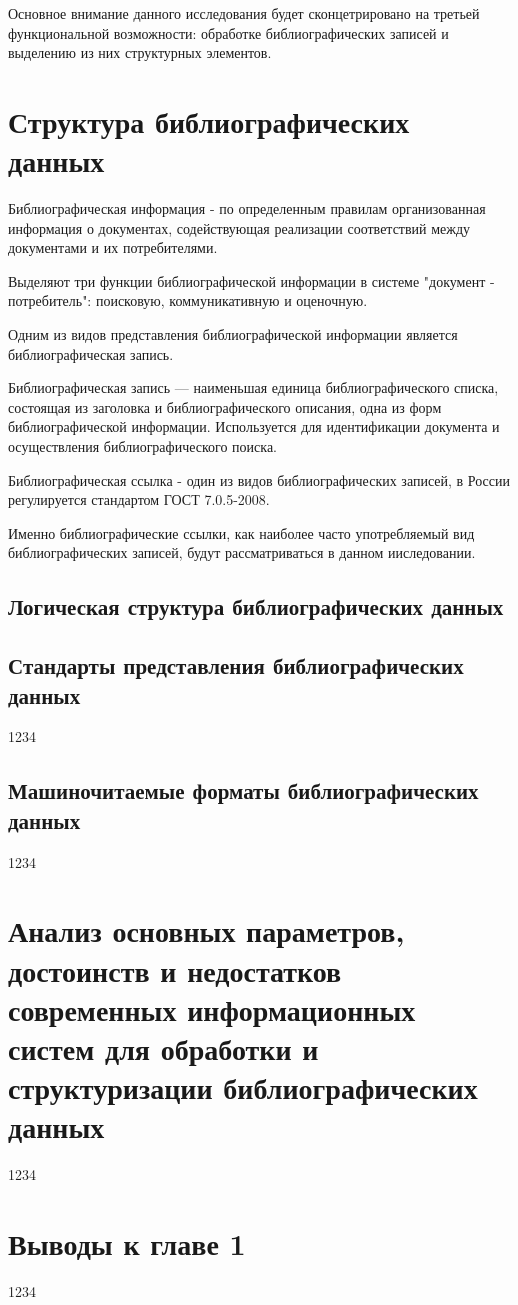 Основное внимание данного исследования будет сконцетрировано на третьей функциональной возможности: обработке библиографических записей и выделению из них структурных элементов.

\section{Структура библиографических данных}

Библиографическая информация - по определенным правилам организованная информация о документах, содействующая реализации соответствий между документами и их потребителями.

Выделяют три функции библиографической информации в системе "документ - потребитель": поисковую, коммуникативную и оценочную.

Одним из видов представления библиографической информации является библиографическая запись.

Библиографическая запись — наименьшая единица библиографического списка, состоящая из заголовка и библиографического описания, одна из форм библиографической информации. Используется для идентификации документа и осуществления библиографического поиска.

Библиографическая ссылка - один из видов библиографических записей, в России регулируется стандартом ГОСТ 7.0.5-2008.

Именно библиографические ссылки, как наиболее часто употребляемый вид библиографических записей, будут рассматриваться в данном ииследовании.

\subsection{Логическая структура библиографических данных}



\subsection{Стандарты представления библиографических данных}
1234

\subsection{Машиночитаемые форматы библиографических данных}
1234

\section{Анализ основных параметров, достоинств и недостатков современных информационных систем для обработки и структуризации библиографических данных}
1234

\section*{Выводы к главе 1}
1234
